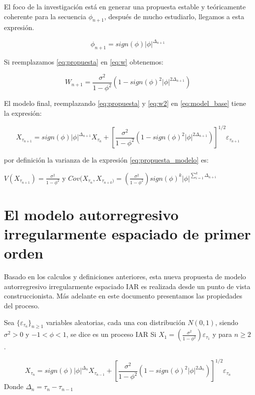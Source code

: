 El foco de la investigación está en generar una propuesta estable y teóricamente coherente para la secuencia $\phi_{n+1}$, después de mucho estudiarlo, llegamos a esta expresión.

\begin{equation}
\phi_{n+1} = sign(\phi)|\phi|^{\Delta_{n+1}}
\label{eq:propuesta}
\end{equation}

Si reemplazamos \ref{eq:propuesta} en \ref{eq:w} obtenemos:

\begin{equation}
W_{n+1} = \frac{\sigma^2}{1-\phi^2} \left(1-sign(\phi)^2 |\phi|^{2\Delta_{n+1}}\right)
\label{eq:w2}
\end{equation}

El modelo final, reemplazando \ref{eq:propuesta} y \ref{eq:w2} en \ref{eq:model_base} tiene la expresión:

\begin{equation}
X_{\tau_{n+1}} = sign(\phi)|\phi|^{\Delta_{n+1}} X_{\tau_n} + \left[\frac{\sigma^2}{1-\phi^2} \left(1-sign(\phi)^2 |\phi|^{2\Delta_{n+1}}\right)\right]^{1/2} \varepsilon_{\tau_{n+1}}
\label{eq:propuesta_modelo}
\end{equation}
 
por definición la varianza de la expresión \ref{eq:propuesta_modelo} es:

 $V(X_{\tau_{n+1}}) =  \frac{\sigma^2}{1-\phi^2}$ y $Cov(X_{\tau_n}, X_{\tau_{n+k})} = \left(\frac{\sigma^2}{1-\phi^2}\right)sign(\phi)^k|\phi|^{\sum_{i=1}^{k}\Delta_{n+i}}$

\section{El modelo autorregresivo irregularmente espaciado de primer orden}

Basado en los calculos y definiciones anteriores, esta nueva propuesta de modelo autorregresivo 
irregularmente espaciado IAR es realizada desde un punto de vista construccionista. Más adelante en este documento
presentamos las propiedades del proceso.

\begin{definition} Sea $\lbrace \varepsilon_{\tau_n} \rbrace_{n \geq 1}$
    variables aleatorias, cada una con distribución $N(0,1)$, siendo $\sigma^2 > 0$ y $-1<\phi<1$, se dice es un proceso IAR Si
    $X_1 = \left( \frac{\sigma^2}{1-\phi^2} \right)\varepsilon_{\tau_1}$ y para $n\geq2$.

    \begin{equation}
        X_{\tau_{n}} = sign(\phi)|\phi|^{\Delta_{n}} X_{\tau_{n-1}} + \left[\frac{\sigma^2}{1-\phi^2} \left(1-sign(\phi)^2 |\phi|^{2\Delta_{n}}\right)\right]^{1/2} \varepsilon_{\tau_{n}}
        \label{eq:FinalModel}
    \end{equation}
    Donde $\Delta_n = \tau_n - \tau_{n-1}$

\end{definition}

